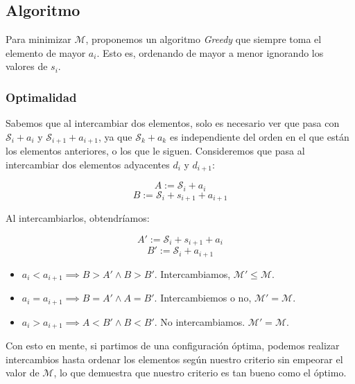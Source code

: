 \subsection{Algoritmo}

Para minimizar $\mathcal{M}$, proponemos un algoritmo \textit{Greedy} que siempre toma el elemento de mayor $a_i$. Esto es, ordenando de mayor a menor ignorando los valores de $s_i$.

\subsubsection{Optimalidad}

Sabemos que al intercambiar dos elementos, solo es necesario ver que pasa con $\mathcal{S}_i + a_i$ y $\mathcal{S}_{i+1} + a_{i+1}$, ya que $\mathcal{S}_k + a_k$ es independiente del orden en el que est\'an los elementos anteriores, o los que le siguen. Consideremos que pasa al intercambiar dos elementos adyacentes $d_i$ y $d_{i+1}$:

\begin{equation*}
    A := \mathcal{S}_i + a_i
\end{equation*}
\begin{equation*}
    B := \mathcal{S}_i + s_{i+1} + a_{i+1}
\end{equation*}

Al intercambiarlos, obtendr\'iamos:

\begin{equation*}
    A' := \mathcal{S}_i + s_{i+1} + a_i
\end{equation*}
\begin{equation*}
    B' := \mathcal{S}_i + a_{i+1}
\end{equation*}

\begin{itemize}
    \item $a_i < a_{i+1} \implies B > A' \land B > B'$. Intercambiamos, $\mathcal{M'} \le \mathcal{M}$.
    \item $a_i = a_{i+1} \implies B = A' \land A = B'$. Intercambiemos o no, $\mathcal{M'} = \mathcal{M}$.
    \item $a_i > a_{i+1} \implies A < B' \land B < B'$. No intercambiamos. $\mathcal{M'} = \mathcal{M}$.
\end{itemize}

Con esto en mente, si partimos de una configuraci\'on \'optima, podemos realizar intercambios hasta ordenar los elementos seg\'un nuestro criterio sin empeorar el valor de $\mathcal{M}$, lo que demuestra que nuestro criterio es tan bueno como el \'optimo.

